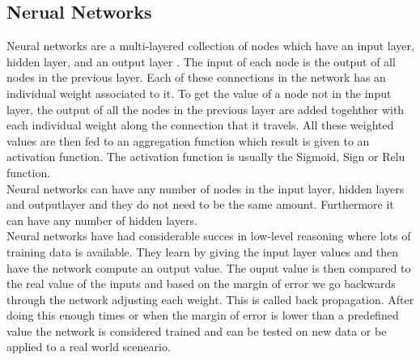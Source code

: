 \subsection{Nerual Networks}
Neural networks are a multi-layered collection of nodes which have an input layer, hidden layer, and an output layer \cite{AI-book}.
The input of each node is the output of all nodes in the previous layer.
Each of these connections in the network has an individual weight associated to it.
To get the value of a node not in the input layer, the output of all the nodes in the previous layer are added togehther with each individual weight along the connection that it travels.
All these weighted values are then fed to an aggregation function which result is given to an activation function.
The activation function is usually the Sigmoid, Sign or Relu function.
\\
Neural networks can have any number of nodes in the input layer, hidden layers and outputlayer and they do not need to be the same amount.
Furthermore it can have any number of hidden layers.
\\
Neural networks have had considerable succes in low-level reasoning where lots of training data is available.
They learn by giving the input layer values and then have the network compute an output value.
The ouput value is then compared to the real value of the inputs and based on the margin of error we go backwards through the network adjusting each weight.
This is called back propagation.
After doing this enough times or when the margin of error is lower than a predefined value the network is considered trained and can be tested on new data or be applied to a real world sceneario.
